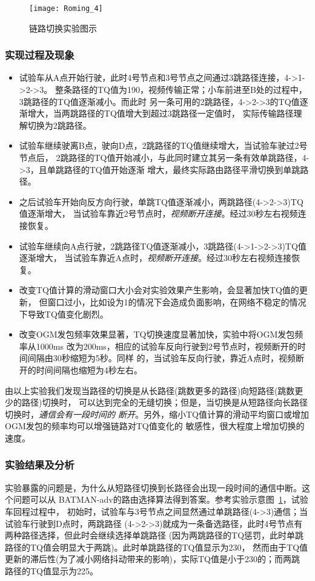 \begin{figure}[H] %
  \centering
  \texttt{[image: Roming\_4]}
  \caption{链路切换实验图示}
  \label{fig:roming_4}
\end{figure}

\subsubsection{实现过程及现象}
\begin{itemize}
\item[(1)] 试验车从A点开始行驶，此时4号节点和3号节点之间通过3跳路径连接，4->1->2->3。
整条路径的TQ值为190，视频传输正常；小车前进至B处的过程中，3跳路径的TQ值逐渐减小。而此时
另一条可用的2跳路径，4->2->3的TQ值逐渐增大，当两跳路径的TQ值增大到超过3跳路径一定值时，
实际传输路径理解切换为2跳路径。
\item[(2)] 试验车继续驶离B点，驶向D点，2跳路径的TQ值继续增大，当试验车驶过2号节点后，
2跳路径的TQ值开始减小，与此同时建立其另一条有效单跳路径，4->3，且单跳路径的TQ值开始逐渐
增大，最终实际路由路径平滑切换到单跳路径。
\item[(3)] 之后试验车开始向反方向行驶，单跳TQ值逐渐减小，两跳路径(4->2->3)TQ值逐渐增大，
当试验车靠近2号节点时，\emph{视频断开连接}。经过30秒左右视频连接恢复。
\item[(4)] 试验车继续向A点行驶，2跳路径TQ值逐渐减小，3跳路径(4->1->2->3)TQ值逐渐增大，
当试验车靠近A点时，\emph{视频断开连接}。经过30秒左右视频连接恢复。
\item[(5)] 改变TQ值计算的滑动窗口大小会对实验效果产生影响，会显著加快TQ值的更新，
但窗口过小，比如设为1的情况下会造成负面影响，在网络不稳定的情况下导致TQ值变化剧烈。
\item[(6)] 改变OGM发包频率效果显著，TQ切换速度显著加快，实验中将OGM发包频率从1000ms
改为200ms，相应的试验车反向行驶到2号节点时，视频断开的时间间隔由30秒缩短为5秒。同样
的，当试验车反向行驶，靠近A点时，视频断开的时间间隔也缩短为4秒左右。
\end{itemize}
由以上实验我们发现当路径的切换是从长路径(跳数更多的路径)向短路径(跳数更少的路径)切换时，
可以达到完全的无缝切换；但是，当切换是从短路径向长路径切换时，\emph{通信会有一段时间的
断开}。另外，缩小TQ值计算的滑动平均窗口或增加OGM发包的频率均可以增强链路对TQ值变化的
敏感性，很大程度上增加切换的速度。

\subsubsection{实验结果及分析}
实验暴露的问题是，为什么从短路径切换到长路径会出现一段时间的通信中断。这个问题可以从
BATMAN-adv的路由选择算法得到答案。参考实验示意图~\ref{fig:roming_4}，试验车回程过程中，
初始时，试验车与3号节点之间显然通过单跳路径(4->3)通信；当试验车行驶到D点时，两跳路径
(4->2->3)就成为一条备选路径，此时4号节点有两种路径选择，但此时会继续选择单跳路径
(因为两跳路径的TQ惩罚，此时单跳路径的TQ值会明显大于两跳)。此时单跳路径的TQ值显示为230，
然而由于TQ值更新的滞后性(为了减小网络抖动带来的影响)，实际TQ值是小于230的；而两跳
路径的TQ值显示为225。

